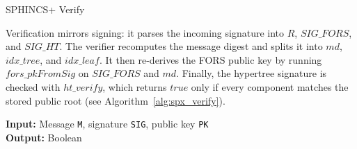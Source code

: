 \begin{subsection}{SPHINCS+ Verify}

Verification mirrors signing: it parses the incoming signature into \(R\), \(\mathit{SIG\_FORS}\), and \(\mathit{SIG\_HT}\). The verifier recomputes the message digest and splits it into \(\mathit{md}\), \(\mathit{idx\_tree}\), and \(\mathit{idx\_leaf}\). It then re-derives the FORS public key by running \(\mathit{fors\_pkFromSig}\) on \(\mathit{SIG\_FORS}\) and \(\mathit{md}\). Finally, the hypertree signature is checked with \(\mathit{ht\_verify}\), which returns \(\mathit{true}\) only if every component matches the stored public root (see Algorithm~\ref{alg:spx_verify}).

\begin{algorithm}
    \caption{spx\_verify -- Verify a SPHINCS+ signature SIG on a message M using a SPHINCS+ public key PK}
    \label{alg:spx_verify}
    \textbf{Input:} Message \texttt{M}, signature \texttt{SIG}, public key \texttt{PK} \\
    \textbf{Output:} Boolean

    \vspace{0.2cm}


\end{algorithm}
\end{subsection}
